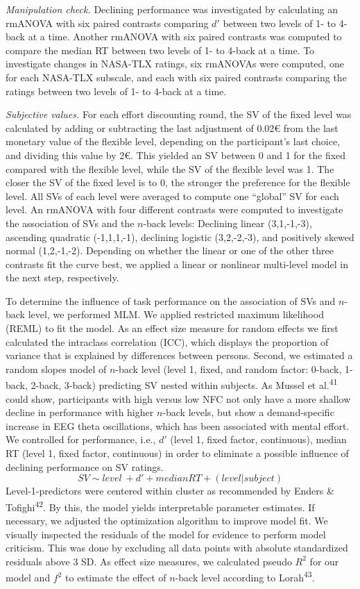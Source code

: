 \documentclass[
  man,floatsintext]{apa6}
\begin{document}
\emph{Manipulation check.}
Declining performance was investigated by calculating an rmANOVA with six paired contrasts comparing \(d'\) between two levels of 1- to 4-back at a time.
Another rmANOVA with six paired contrasts was computed to compare the median RT between two levels of 1- to 4-back at a time.
To investigate changes in NASA-TLX ratings, six rmANOVAs were computed, one for each NASA-TLX subscale, and each with six paired contrasts comparing the ratings between two levels of 1- to 4-back at a time.

\emph{Subjective values.}
For each effort discounting round, the SV of the fixed level was calculated by adding or subtracting the last adjustment of 0.02€ from the last monetary value of the flexible level, depending on the participant's last choice, and dividing this value by 2€.
This yielded an SV between 0 and 1 for the fixed compared with the flexible level, while the SV of the flexible level was 1.
The closer the SV of the fixed level is to 0, the stronger the preference for the flexible level.
All SVs of each level were averaged to compute one ``global'' SV for each level.
An rmANOVA with four different contrasts were computed to investigate the association of SVs and the \(n\)-back levels: Declining linear (3,1,-1,-3), ascending quadratic (-1,1,1,-1), declining logistic (3,2,-2,-3), and positively skewed normal (1,2,-1,-2).
Depending on whether the linear or one of the other three contrasts fit the curve best, we applied a linear or nonlinear multi-level model in the next step, respectively.

To determine the influence of task performance on the association of SVs and \(n\)-back level, we performed MLM.
We applied restricted maximum likelihood (REML) to fit the model.
As an effect size measure for random effects we first calculated the intraclass correlation (ICC), which displays the proportion of variance that is explained by differences between persons.
Second, we estimated a random slopes model of \(n\)-back level (level 1, fixed, and random factor: 0-back, 1-back, 2-back, 3-back) predicting SV nested within subjects.
As Mussel et al.\textsuperscript{41} could show, participants with high versus low NFC not only have a more shallow decline in performance with higher \(n\)-back levels, but show a demand-specific increase in EEG theta oscillations, which has been associated with mental effort.
We controlled for performance, i.e., \(d'\) (level 1, fixed factor, continuous), median RT (level 1, fixed factor, continuous) in order to eliminate a possible influence of declining performance on SV ratings.
\[
SV \sim level\ + d' + median RT + (level|subject)
\]
Level-1-predictors were centered within cluster as recommended by Enders \& Tofighi\textsuperscript{42}.
By this, the model yields interpretable parameter estimates.
If necessary, we adjusted the optimization algorithm to improve model fit.
We visually inspected the residuals of the model for evidence to perform model criticism.
This was done by excluding all data points with absolute standardized residuals above 3 SD.
As effect size measures, we calculated pseudo \(R^{2}\) for our model and \(f^{2}\) to estimate the effect of \(n\)-back level according to Lorah\textsuperscript{43}.
\end{document}
